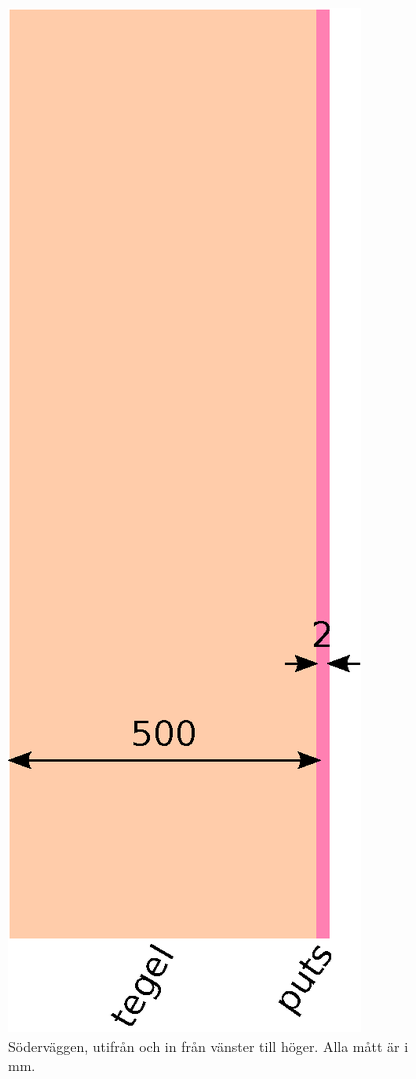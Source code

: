 \begin{figure}[hpbt]
\centering
\includegraphics[height=0.3\textheight]{images/sodervagg.eps}
\caption{\label{fig:sodervagg}{Söderväggen, utifrån och in från vänster till höger. Alla mått är i mm.}}
\end{figure}

